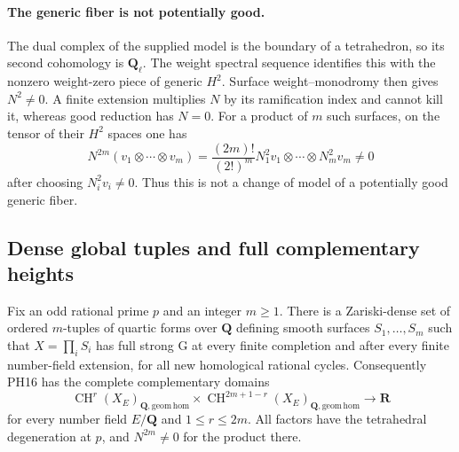 \paragraph{The generic fiber is not potentially good.}
The dual complex of the supplied model is the boundary of a
tetrahedron, so its second cohomology is $\mathbf Q_\ell$.
The weight spectral sequence identifies this with the nonzero
weight-zero piece of generic $H^2$.  Surface weight--monodromy
then gives $N^2\ne0$.  A finite extension multiplies $N$ by
its ramification index and cannot kill it, whereas good reduction
has $N=0$.  For a product of $m$ such surfaces, on the tensor
of their $H^2$ spaces one has
\[
 N^{2m}(v_1\otimes\cdots\otimes v_m)
   =\frac{(2m)!}{(2!)^m}
       N_1^2v_1\otimes\cdots\otimes N_m^2v_m\ne0
 \tag{AT20.13}\label{r20at:monodromy}
\]
after choosing $N_i^2v_i\ne0$.  Thus this is not a change of
model of a potentially good generic fiber.

\subsection{Dense global tuples and full complementary heights}

\begin{theorem}
\label{r20at:global}
Fix an odd rational prime $p$ and an integer $m\ge1$.
There is a Zariski-dense set of ordered $m$-tuples of quartic
forms over $\mathbf Q$ defining smooth surfaces
$S_1,\ldots,S_m$ such that $X=\prod_iS_i$ has full
strong G at every finite completion and after every finite
number-field extension, for all new homological rational cycles.
Consequently PH16 has the complete complementary domains
\[
 \operatorname{CH}^r(X_E)_{\mathbf Q,\mathrm{geom\,hom}}
 \times
 \operatorname{CH}^{2m+1-r}(X_E)_{\mathbf Q,\mathrm{geom\,hom}}
                          \longrightarrow\mathbf R
 \tag{AT20.14}\label{r20at:height}
\]
for every number field $E/\mathbf Q$ and $1\le r\le2m$.
All factors have the tetrahedral degeneration at $p$, and
$N^{2m}\ne0$ for the product there.
\end{theorem}

